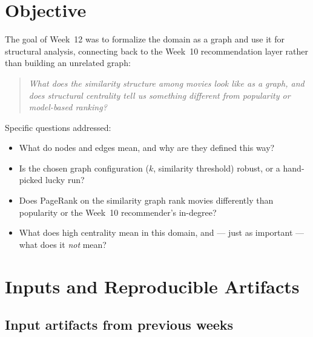 \documentclass[12pt,a4paper]{article}
\begin{document}
\section{Objective}

The goal of Week~12 was to formalize the domain as a graph and use it for structural analysis,
connecting back to the Week~10 recommendation layer rather than building an unrelated graph:

\begin{quote}
  \textit{What does the similarity structure among movies look like as a graph, and does structural
  centrality tell us something different from popularity or model-based ranking?}
\end{quote}

Specific questions addressed:
\begin{itemize}[nosep]
  \item What do nodes and edges mean, and why are they defined this way?
  \item Is the chosen graph configuration ($k$, similarity threshold) robust, or a hand-picked lucky run?
  \item Does PageRank on the similarity graph rank movies differently than popularity or the
    Week~10 recommender's in-degree?
  \item What does high centrality mean in this domain, and --- just as important --- what does it
    \emph{not} mean?
\end{itemize}

\section{Inputs and Reproducible Artifacts}

\subsection{Input artifacts from previous weeks}
\end{document}
